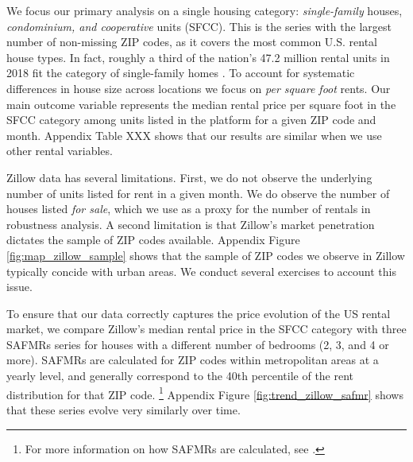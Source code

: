 We focus our primary analysis on a single housing category:
\textit{single-family} houses, \textit{condominium, and cooperative} units (SFCC).
This is the series with the largest number of non-missing ZIP codes, as it 
covers the most common U.S. rental house types.
In fact, roughly a third of the nation's 47.2 million rental units in 2018 fit 
the category of single-family homes \parencite{Fernald2020}.
%
%
%
To account for systematic differences in house size across locations we focus 
on \textit{per square foot} rents.
Our main outcome variable represents the median rental price per square foot in 
the SFCC category among units listed in the platform for a given ZIP code and 
month.
Appendix Table XXX shows that our results are similar when we use other rental 
variables.
%
%

Zillow data has several limitations.
First, we do not observe the underlying number of units listed for rent in a 
given month.
We do observe the number of houses listed \textit{for sale}, which we use as a
proxy for the number of rentals in robustness analysis.
A second limitation is that Zillow's market penetration dictates the sample of 
ZIP codes available.
Appendix Figure \ref{fig:map_zillow_sample} shows that the sample of ZIP codes
we observe in Zillow typically concide with urban areas.
%
% 
%
We conduct several exercises to account this issue.

To ensure that our data correctly captures the price evolution of the US rental 
market, we compare 
Zillow's median rental price in the SFCC category with 
three SAFMRs series for houses with a different number of bedrooms (2, 3, and 
4 or more).
SAFMRs are calculated for ZIP codes within metropolitan areas at a yearly level, 
and generally correspond to the 40th percentile of the rent distribution for 
that ZIP code.%
\footnote{For more information on how SAFMRs are calculated, see 
\textcite[][page 41641]{hudPreamble}.}
Appendix Figure \ref{fig:trend_zillow_safmr} shows that these series evolve
very similarly over time.


